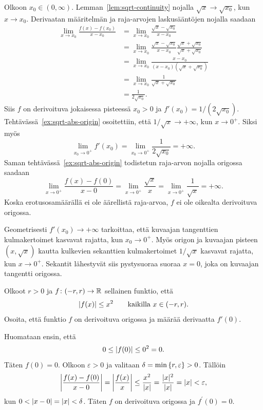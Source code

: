 \documentclass[11pt,a4paper]{amsart}
\begin{document}
\begin{solution}
  Olkoon \(x_0 \in (0, \infty)\). Lemman~\ref{lem:sqrt-continuity}
  nojalla \(\sqrt{x} \to \sqrt{x_0}\), kun \(x \to x_0\).
  Derivaatan määritelmän ja raja-arvojen laskusääntöjen nojalla saadaan
  \[
    \begin{aligned}
      \lim_{x \to x_0} \frac{f(x) - f(x_0)}{x - x_0}
      &= \lim_{x \to x_0} \frac{\sqrt{x} - \sqrt{x_0}}{x - x_0} \\
      &= \lim_{x \to x_0} \frac{\sqrt{x} - \sqrt{x_0}}{x - x_0}
      \frac{\sqrt{x} + \sqrt{x_0}}{\sqrt{x} + \sqrt{x_0}} \\
      &= \lim_{x \to x_0} \frac{x - x_0}{(x - x_0)(\sqrt{x} + \sqrt{x_0})} \\
      &= \lim_{x \to x_0} \frac{1}{\sqrt{x} + \sqrt{x_0}} \\
      &= \frac{1}{2\sqrt{x_0}}.
    \end{aligned}
  \]
  Siis \(f\) on derivoituva jokaisessa pisteessä \(x_0 > 0\) ja
  \(f'(x_0) = 1/(2\sqrt{x_0})\). Tehtävässä~\ref{ex:sqrt-abs-origin}
  osoitettiin, että \(1/\sqrt{x} \to +\infty\), kun \(x \to 0^+\).
  Siksi myös
  \[
    \lim_{x_0 \to 0^+} f'(x_0)
    = \lim_{x_0 \to 0^+} \frac{1}{2\sqrt{x_0}}
    = +\infty.
  \]
  Saman tehtävässä~\ref{ex:sqrt-abs-origin} todistetun raja-arvon nojalla
  origossa saadaan
  \[
    \lim_{x \to 0^+} \frac{f(x) - f(0)}{x - 0} =
    \lim_{x \to 0^+} \frac{\sqrt{x}}{x} =
    \lim_{x \to 0^+} \frac{1}{\sqrt{x}} = +\infty.
  \]
  Koska erotusosamäärällä ei ole äärellistä raja-arvoa, \(f\) ei ole
  oikealta derivoituva origossa.

  Geometrisesti \(f'(x_0) \to +\infty\) tarkoittaa, että kuvaajan
  tangenttien kulmakertoimet kasvavat rajatta, kun \(x_0 \to 0^+\).
  Myös origon ja kuvaajan pisteen \((x, \sqrt{x})\) kautta kulkevien
  sekanttien kulmakertoimet \(1/\sqrt{x}\) kasvavat rajatta, kun
  \(x \to 0^+\). Sekantit lähestyvät siis pystysuoraa suoraa \(x = 0\),
  joka on kuvaajan tangentti origossa.
\end{solution}

\begin{exercise}
  Olkoot \(r > 0\) ja \(f \colon (-r, r) \to \RR\) sellainen funktio,
  että
  \[
    \abs{f(x)} \leq x^2 \qquad\text{kaikilla } x \in (-r, r).
  \]
  Osoita, että funktio \(f\) on derivoituva origossa ja määrää derivaatta
  \(f'(0)\).
\end{exercise}

\begin{solution}
  Huomataan ensin, että
  \[
    0 \leq \abs{f(0)} \leq 0^2 = 0.
  \]
  Täten \(f(0) = 0\). Olkoon \(\varepsilon > 0\) ja valitaan \(\delta
  = \minset{r, \varepsilon} > 0\). Tällöin
  \[
    \abs*{\frac{f(x) - f(0)}{x - 0}} = \abs*{\frac{f(x)}{x}}
    \leq \frac{x^2}{\abs{x}} = \frac{\abs{x}^2}{\abs{x}} = \abs{x} <
    \varepsilon,
  \]
  kun \(0 < \abs{x - 0} = \abs{x} < \delta\). Täten \(f\) on derivoituva
  origossa ja \(f^{\prime}(0) = 0\).
\end{solution}
\end{document}
